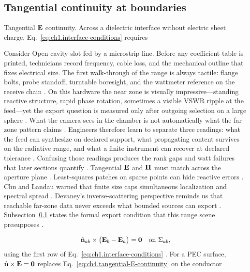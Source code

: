 \subsection{Tangential continuity at boundaries}
\label{sec:ch423}
Tangential \(\mathbf{E}\) continuity. Across a dielectric interface without electric sheet charge,
Eq.~\eqref{eq:ch1.interface-conditions} requires
\begin{physicalvignette}
Consider Open cavity slot fed by a microstrip line. Before any coefficient table is printed, technicians record frequency, cable loss, and the mechanical outline that fixes electrical size. The first walk-through of the range is always tactile: flange bolts, probe standoff, turntable boresight, and the wattmeter reference on the receive chain \cite{hansen1988}.
On this hardware the near zone is visually impressive---standing reactive structure, rapid phase rotation, sometimes a visible VSWR ripple at the feed---yet the export question is measured only after outgoing selection on a large sphere \cite{harrington2001}. What the camera sees in the chamber is not automatically what the far-zone pattern claims \cite{stratton1941}.
Engineers therefore learn to separate three readings: what the feed can synthesize on declared support, what propagating content survives on the radiative range, and what a finite instrument can recover at declared tolerance \cite{devaney2004}. Confusing those readings produces the rank gaps and watt failures that later sections quantify \cite{pal2026}.
Tangential $\mathbf{E}$ and $\mathbf{H}$ must match across the aperture plane \cite{stratton1941}. Least-squares patches on sparse points can hide reactive errors \cite{harrington2001}.
Chu and Landau warned that finite size caps simultaneous localization and spectral spread \cite{chu1948}. Devaney's inverse-scattering perspective reminds us that reachable far-zone data never exceeds what bounded sources can export \cite{devaney2004}.
Subsection~\ref{sec:ch423} states the formal export condition that this range scene presupposes \cite{stratton1941}.
\end{physicalvignette}
\begin{equation}
\label{eq:ch4.tangential-E-continuity}
\hat{\mathbf{n}}_{ab}\times\big(\mathbf{E}_{b}-\mathbf{E}_{a}\big)=\mathbf{0}
\quad\text{on}\ \Sigma_{ab},
\end{equation}
using the first row of Eq.~\eqref{eq:ch1.interface-conditions} \cite{stratton1941}. For a PEC surface,
\(\hat{\mathbf{n}}\times\mathbf{E}=\mathbf{0}\) replaces Eq.~\eqref{eq:ch4.tangential-E-continuity} on the conductor
